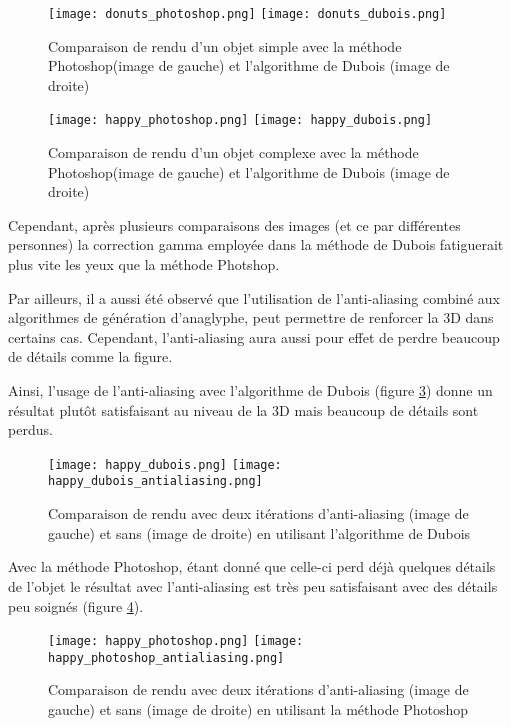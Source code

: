 \begin{figure}[h!]
	\centering
	 \texttt{[image: donuts\_photoshop.png]}
	\texttt{[image: donuts\_dubois.png]}
	\caption{\label{fig:photoshop_dubois_donuts} Comparaison de rendu d'un objet simple avec la méthode Photoshop(image de gauche) et l'algorithme de Dubois (image de droite)\protect}
\end{figure}
\begin{figure}[h!]
	\centering
	 \texttt{[image: happy\_photoshop.png]}
	\texttt{[image: happy\_dubois.png]}
	\caption{\label{fig:photoshop_dubois_happy} Comparaison de rendu d'un objet complexe avec la méthode Photoshop(image de gauche) et l'algorithme de Dubois (image de droite)\protect}
\end{figure}

Cependant, après plusieurs comparaisons des images (et ce par différentes personnes) la correction gamma employée dans la méthode de Dubois fatiguerait plus vite les yeux que la méthode Photshop.

Par ailleurs, il a aussi été observé que l'utilisation de l'anti-aliasing combiné aux algorithmes de génération d'anaglyphe, peut permettre de renforcer la 3D dans certains cas. Cependant, l'anti-aliasing aura aussi pour effet de perdre beaucoup de détails comme la figure. 

Ainsi, l'usage de l'anti-aliasing avec l'algorithme de Dubois (figure \ref{fig:dubois_antialiasing}) donne un résultat plutôt satisfaisant au niveau de la 3D mais beaucoup de détails sont perdus. 
\begin{figure}[h!]
	\centering
	\texttt{[image: happy\_dubois.png]}
    \texttt{[image: happy\_dubois\_antialiasing.png]}
	\caption{\label{fig:dubois_antialiasing} Comparaison de rendu avec deux itérations d'anti-aliasing (image de gauche) et sans (image de droite) en utilisant l'algorithme de Dubois \protect}
\end{figure}

Avec la méthode Photoshop, étant donné que celle-ci perd déjà quelques détails de l'objet le résultat avec l'anti-aliasing  est très peu satisfaisant avec des détails peu soignés (figure \ref{fig:photoshop_antialiasing}). 
\begin{figure}[h!]
	\centering
	\texttt{[image: happy\_photoshop.png]}
    \texttt{[image: happy\_photoshop\_antialiasing.png]}
	\caption{\label{fig:photoshop_antialiasing} Comparaison de rendu avec deux itérations d'anti-aliasing (image de gauche) et sans (image de droite) en utilisant la méthode Photoshop \protect}
\end{figure}


